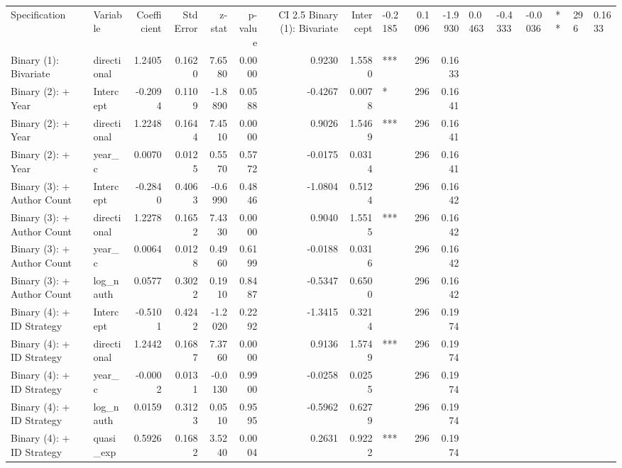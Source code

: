 \begin{tabular}{llrrrrrrlrr}
\toprule
Specification & Variable & Coefficient & Std Error & z-stat & p-value & CI 2.5%
\midrule
Binary (1): Bivariate & Intercept & -0.2185 & 0.1096 & -1.9930 & 0.0463 & -0.4333 & -0.0036 & ** & 296 & 0.1633 \\
Binary (1): Bivariate & directional & 1.2405 & 0.1620 & 7.6580 & 0.0000 & 0.9230 & 1.5580 & *** & 296 & 0.1633 \\
Binary (2): + Year & Intercept & -0.2094 & 0.1109 & -1.8890 & 0.0588 & -0.4267 & 0.0078 & * & 296 & 0.1641 \\
Binary (2): + Year & directional & 1.2248 & 0.1644 & 7.4510 & 0.0000 & 0.9026 & 1.5469 & *** & 296 & 0.1641 \\
Binary (2): + Year & year_c & 0.0070 & 0.0125 & 0.5570 & 0.5772 & -0.0175 & 0.0314 &  & 296 & 0.1641 \\
Binary (3): + Author Count & Intercept & -0.2840 & 0.4063 & -0.6990 & 0.4846 & -1.0804 & 0.5124 &  & 296 & 0.1642 \\
Binary (3): + Author Count & directional & 1.2278 & 0.1652 & 7.4330 & 0.0000 & 0.9040 & 1.5515 & *** & 296 & 0.1642 \\
Binary (3): + Author Count & year_c & 0.0064 & 0.0128 & 0.4960 & 0.6199 & -0.0188 & 0.0316 &  & 296 & 0.1642 \\
Binary (3): + Author Count & log_nauth & 0.0577 & 0.3022 & 0.1910 & 0.8487 & -0.5347 & 0.6500 &  & 296 & 0.1642 \\
Binary (4): + ID Strategy & Intercept & -0.5101 & 0.4242 & -1.2020 & 0.2292 & -1.3415 & 0.3214 &  & 296 & 0.1974 \\
Binary (4): + ID Strategy & directional & 1.2442 & 0.1687 & 7.3760 & 0.0000 & 0.9136 & 1.5749 & *** & 296 & 0.1974 \\
Binary (4): + ID Strategy & year_c & -0.0002 & 0.0131 & -0.0130 & 0.9900 & -0.0258 & 0.0255 &  & 296 & 0.1974 \\
Binary (4): + ID Strategy & log_nauth & 0.0159 & 0.3123 & 0.0510 & 0.9595 & -0.5962 & 0.6279 &  & 296 & 0.1974 \\
Binary (4): + ID Strategy & quasi_exp & 0.5926 & 0.1682 & 3.5240 & 0.0004 & 0.2631 & 0.9222 & *** & 296 & 0.1974 \\
\bottomrule
\end{tabular}
